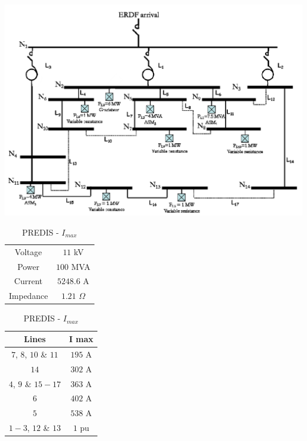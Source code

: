 \begin{table}[!h]
    \begin{minipage}[!h]{.65\textwidth}
	\centering
	\includegraphics[width=1\textwidth]{NwImages/PREDIS}
    \end{minipage}
    \begin{minipage}[h]{.35\textwidth }
    \centering
	\begin{tabular}{cc}
	\hline
	Voltage & $11$ kV\\
	\rowcolor{gray!15}
	Power & $100$ MVA\\
	Current &  $5248.6$ A\\
	\rowcolor{gray!15}
	Impedance & $1.21$ $\Omega$\\
	\hline
	\end{tabular}
	\caption{PREDIS - Base Values}

	\vspace*{1 cm}

	\begin{tabular}{cc}
	\rowcolor{gray!25}
	\textbf{Lines} & \textbf{I max}\\
	\hline
	$7$, $8$, $10$ \& $11$ & $195$ A\\
	\rowcolor{gray!15}
	$14$ & $302$ A\\
	$4$, $9$ \& $15-17$ & $363$ A\\
	\rowcolor{gray!15}
	$6$ & $402$ A\\
	$5$ & $538$ A\\
	\rowcolor{gray!15}
	$1-3$, $12$ \& $13$ & $1$ pu\\
	\hline
	\end{tabular}
	\caption{PREDIS - $I_{max}$}
    \end{minipage}%
\end{table}


